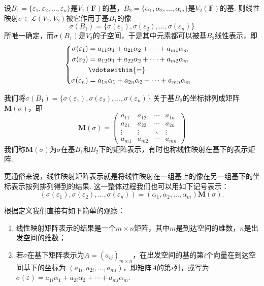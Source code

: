 \begin{definition}\label{def:7:线性映射矩阵表示}
    设$B_1=\{\varepsilon_1,\varepsilon_2,\ldots,\varepsilon_n\}$是$V_1(\mathbf{F})$的基，$B_2=\{\alpha_1,\alpha_2,\ldots,\alpha_m\}$是$V_2(\mathbf{F})$的基.
    则线性映射$\sigma \in \mathcal{L}(V_1,V_2)$被它作用于基$B_1$的像
    \[\sigma(B_1)=\{\sigma(\varepsilon_1),\sigma(\varepsilon_2),\ldots,\sigma(\varepsilon_n)\}\]
    所唯一确定，而$\sigma(B_1)$是$V_2$的子空间，于是其中元素都可以被基$B_2$线性表示，即
    \[ \begin{cases} \begin{aligned}
        \sigma(\varepsilon_1) &= a_{11}\alpha_1+a_{21}\alpha_2+\cdots+a_{m1}\alpha_m \\
        \sigma(\varepsilon_2) &= a_{12}\alpha_1+a_{22}\alpha_2+\cdots+a_{m2}\alpha_m \\
        &\vdotswithin{ = } \\
        \sigma(\varepsilon_n) &= a_{1n}\alpha_1+a_{2n}\alpha_2+\cdots+a_{mn}\alpha_m
     \end{aligned} \end{cases} \]

    我们将$\sigma(B_1)=\{\sigma(\varepsilon_1),\sigma(\varepsilon_2),\ldots,\sigma(\varepsilon_n)\}$
    关于基$B_2$的坐标排列成矩阵$\mathbf{M}(\sigma)$，即
    \[\mathbf{M}(\sigma)=\begin{pmatrix}
        a_{11} & a_{12} & \cdots & a_{1n} \\
        a_{21} & a_{22} & \cdots & a_{2n} \\
        \vdots & \vdots & \ddots & \vdots \\
        a_{m1} & a_{m2} & \cdots & a_{mn}
    \end{pmatrix}\]
    我们称$\mathbf{M}(\sigma)$为$\sigma$在基$B_1$和$B_2$下的矩阵表示，有时也称线性映射在基下的表示矩阵.
\end{definition}
更通俗来说，线性映射矩阵表示就是将线性映射在一组基上的像在另一组基下的坐标表示按列排列得到的结果.
这一整体过程我们也可以用如下记号表示：
\begin{equation}\label{eq:7:线性映射矩阵表示}
    (\sigma(\varepsilon_1),\sigma(\varepsilon_2),\ldots,\sigma(\varepsilon_n))=(\alpha_1,\alpha_2,\ldots,\alpha_m)\mathbf{M}(\sigma).
\end{equation}

根据定义我们直接有如下简单的观察：
\begin{enumerate}
    \item 线性映射矩阵表示的结果是一个$m\times n$矩阵，其中$m$是到达空间的维数，$n$是出发空间的维数；
    \item 若$\sigma$在基下矩阵表示为$A=(a_{ij})_{m\times n}$，在出发空间的基的第$i$个向量在到达空间基下的坐标为
    $(a_{1i},a_{2i},\ldots,a_{mi})$，即矩阵$A$的第$i$列，或写为$\sigma(\varepsilon)=a_{1i}\alpha_1+a_{2i}\alpha_2+\cdots+a_{mi}\alpha_m$.
\end{enumerate}

